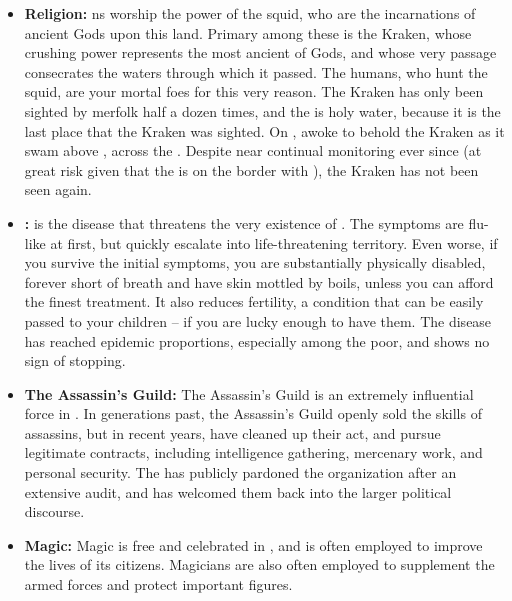 \documentclass[blue]{NeptuneBall}
\begin{document}
\begin{itemize}
  \item {\bf Religion:} \pPacifica{}ns worship the power of the squid, who are the incarnations of ancient Gods upon this land. Primary among these is the Kraken, whose crushing power represents the most ancient of Gods, and whose very passage consecrates the waters through which it passed. The humans, who hunt the squid, are your mortal foes for this very reason. The Kraken has only been sighted by merfolk half a dozen times, and the \pGazaStrip{} is holy water, because it is the last place that the Kraken was sighted. On \cKraken{\MYname}, \cLiar{\MYname} awoke to behold the Kraken as it swam above \cLiar{\them}, across the \pGazaStrip{}. Despite near continual monitoring ever since (at great risk given that the \pGazaStrip{} is on the border with \pAtlantis{}), the Kraken has not been seen again.
  \item {\bf \cPolio{}:} \cPolio{} is the disease that threatens the very existence of \pPacifica{}. The symptoms are flu-like at first, but quickly escalate into life-threatening territory. Even worse, if you survive the initial symptoms, you are substantially physically disabled, forever short of breath and have skin mottled by boils, unless you can afford the finest treatment. It also reduces fertility, a condition that can be easily passed to your children -- if you are lucky enough to have them. The disease has reached epidemic proportions, especially among the poor, and shows no sign of stopping. 
  \item {\bf The Assassin's Guild:} The Assassin's Guild is an extremely influential force in \pPacifica{}. In generations past, the Assassin's Guild openly sold the skills of assassins, but in recent years, have cleaned up their act, and pursue legitimate contracts, including intelligence gathering, mercenary work, and personal security. The \cPacificanRuler{\King} has publicly pardoned the organization after an extensive audit, and has welcomed them back into the larger political discourse.
  \item {\bf Magic:} Magic is free and celebrated in \pPacifica{}, and is often employed to improve the lives of its citizens. Magicians are also often employed to supplement the armed forces and protect important figures.
  

\end{itemize}
\end{document}
